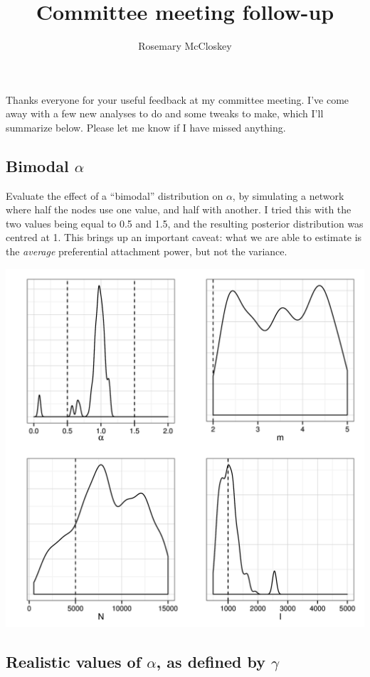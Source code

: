 \documentclass{article}
\title{Committee meeting follow-up}
\author{Rosemary McCloskey}
\begin{document}
\maketitle

\onehalfspacing

Thanks everyone for your useful feedback at my committee meeting. I've come
away with a few new analyses to do and some tweaks to make, which I'll
summarize below. Please let me know if I have missed anything.

\subsection*{Bimodal $\alpha$}

Evaluate the effect of a ``bimodal'' distribution on $\alpha$, by simulating a
network where half the nodes use one value, and half with another. I tried this
with the two values being equal to 0.5 and 1.5, and the resulting posterior
distribution was centred at 1. This brings up an important caveat: what we are
able to estimate is the \emph{average} preferential attachment power, but not
the variance.

\includegraphics[scale=0.15]{mixed-alpha}

\subsection*{Realistic values of $\alpha$, as defined by $\gamma$}
\end{document}

